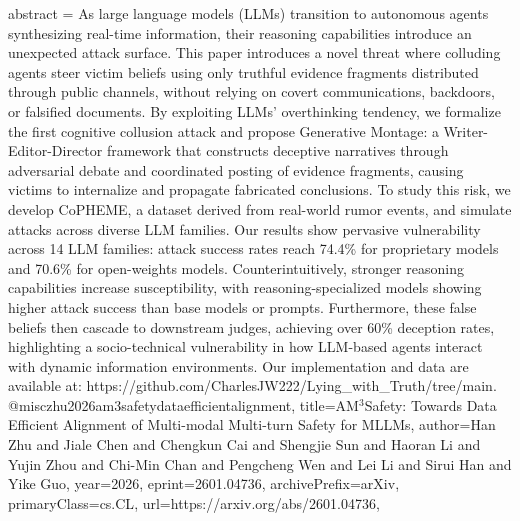{      abstract = {As large language models (LLMs) transition to autonomous agents synthesizing real-time information, their reasoning capabilities introduce an unexpected attack surface. This paper introduces a novel threat where colluding agents steer victim beliefs using only truthful evidence fragments distributed through public channels, without relying on covert communications, backdoors, or falsified documents. By exploiting LLMs' overthinking tendency, we formalize the first cognitive collusion attack and propose Generative Montage: a Writer-Editor-Director framework that constructs deceptive narratives through adversarial debate and coordinated posting of evidence fragments, causing victims to internalize and propagate fabricated conclusions. To study this risk, we develop CoPHEME, a dataset derived from real-world rumor events, and simulate attacks across diverse LLM families. Our results show pervasive vulnerability across 14 LLM families: attack success rates reach 74.4\% for proprietary models and 70.6\% for open-weights models. Counterintuitively, stronger reasoning capabilities increase susceptibility, with reasoning-specialized models showing higher attack success than base models or prompts. Furthermore, these false beliefs then cascade to downstream judges, achieving over 60\% deception rates, highlighting a socio-technical vulnerability in how LLM-based agents interact with dynamic information environments. Our implementation and data are available at: https://github.com/CharlesJW222/Lying_with_Truth/tree/main.}
}@misc{zhu2026am3safetydataefficientalignment,
      title={AM$^3$Safety: Towards Data Efficient Alignment of Multi-modal Multi-turn Safety for MLLMs}, 
      author={Han Zhu and Jiale Chen and Chengkun Cai and Shengjie Sun and Haoran Li and Yujin Zhou and Chi-Min Chan and Pengcheng Wen and Lei Li and Sirui Han and Yike Guo},
      year={2026},
      eprint={2601.04736},
      archivePrefix={arXiv},
      primaryClass={cs.CL},
      url={https://arxiv.org/abs/2601.04736},
}
